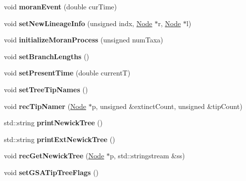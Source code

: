 \begin{DoxyCompactItemize}
void {\bfseries moran\+Event} (double cur\+Time)
\item 
\mbox{\label{class_species_tree_a3d2f062c83f58d1ce292572603d830ef}} 
void {\bfseries set\+New\+Lineage\+Info} (unsigned indx, \mbox{\hyperlink{class_node}{Node}} $\ast$r, \mbox{\hyperlink{class_node}{Node}} $\ast$l)
\item 
\mbox{\label{class_species_tree_a9601d07f6e42decab6bbf68a549064be}} 
void {\bfseries initialize\+Moran\+Process} (unsigned num\+Taxa)
\item 
\mbox{\label{class_species_tree_a7a49ddcc35dc7f6b51aa4cf5b403e29c}} 
void {\bfseries set\+Branch\+Lengths} ()
\item 
\mbox{\label{class_species_tree_ada6de8c8471a9006410cc922d2c4671a}} 
void {\bfseries set\+Present\+Time} (double currentT)
\item 
\mbox{\label{class_species_tree_ab36ef4fd1630ba1e41c98de7b9a60adc}} 
void {\bfseries set\+Tree\+Tip\+Names} ()
\item 
\mbox{\label{class_species_tree_a8268e21fa7f2aef107cc541a3d2ff38b}} 
void {\bfseries rec\+Tip\+Namer} (\mbox{\hyperlink{class_node}{Node}} $\ast$p, unsigned \&extinct\+Count, unsigned \&tip\+Count)
\item 
\mbox{\label{class_species_tree_a39c321c46972b2124e94762a31238eed}} 
std\+::string {\bfseries print\+Newick\+Tree} ()
\item 
\mbox{\label{class_species_tree_afc6af7f5a65660f3de48d95659d19227}} 
std\+::string {\bfseries print\+Ext\+Newick\+Tree} ()
\item 
\mbox{\label{class_species_tree_ae861cac65f57edd749ba8f4f02e43474}} 
void {\bfseries rec\+Get\+Newick\+Tree} (\mbox{\hyperlink{class_node}{Node}} $\ast$p, std\+::stringstream \&ss)
\item 
\mbox{\label{class_species_tree_a95f0df3146f38e58d2af1c3ea6ee550f}} 
void {\bfseries set\+G\+S\+A\+Tip\+Tree\+Flags} ()

\end{DoxyCompactItemize}
